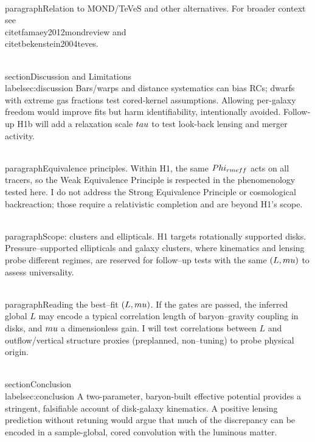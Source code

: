 \documentclass[11pt,a4paper]{article}
\begin{document}
\\paragraph{Relation to MOND/TeVeS and other alternatives.}
For broader context see \\citet{famaey2012mondreview} and \\citet{bekenstein2004teves}.

\\section{Discussion and Limitations}\\label{sec:discussion}
Bars/warps and distance systematics can bias RCs; dwarfs with extreme gas fractions test cored-kernel assumptions. Allowing per-galaxy freedom would improve fits but harm identifiability, intentionally avoided. Follow-up H1b will add a relaxation scale $\\tau$ to test look-back lensing and merger activity.

\\paragraph{Equivalence principles.}
Within H1, the same $\\Phi_{\\rm eff}$ acts on all tracers, so the Weak Equivalence Principle is respected in the phenomenology tested here. I do not address the Strong Equivalence Principle or cosmological backreaction; those require a relativistic completion and are beyond H1's scope.

\\paragraph{Scope: clusters and ellipticals.}
H1 targets rotationally supported disks. Pressure–supported ellipticals and galaxy clusters, where kinematics and lensing probe different regimes, are reserved for follow–up tests with the same $(L,\\mu)$ to assess universality.

\\paragraph{Reading the best–fit $(L,\\mu)$.}
If the gates are passed, the inferred global $L$ may encode a typical correlation length of baryon–gravity coupling in disks, and $\\mu$ a dimensionless gain. I will test correlations between $L$ and outflow/vertical structure proxies (preplanned, non–tuning) to probe physical origin.

\\section{Conclusion}\\label{sec:conclusion}
A two-parameter, baryon-built effective potential provides a stringent, falsifiable account of disk-galaxy kinematics. A positive lensing prediction without retuning would argue that much of the discrepancy can be encoded in a sample-global, cored convolution with the luminous matter.
\end{document}
